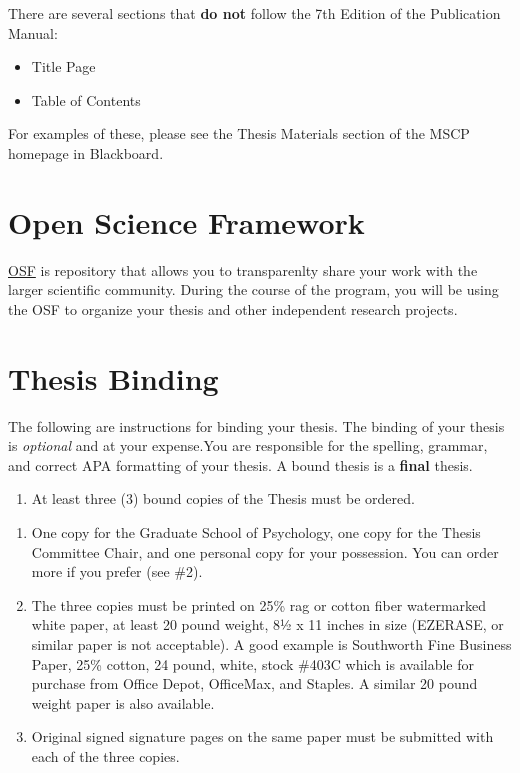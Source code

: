 \documentclass[]{book}
\providecommand{\tightlist}{%
  \setlength{\itemsep}{0pt}\setlength{\parskip}{0pt}}
\begin{document}
There are several sections that \textbf{do not} follow the 7th Edition of the Publication Manual:

\begin{itemize}
\tightlist
\item
  Title Page
\item
  Table of Contents
\end{itemize}

For examples of these, please see the Thesis Materials section of the MSCP homepage in Blackboard.

\hypertarget{open-science-framework}{%
\chapter{Open Science Framework}\label{open-science-framework}}

\href{https://osf.io/}{OSF} is repository that allows you to transparenlty share your work with the larger scientific community. During the course of the program, you will be using the OSF to organize your thesis and other independent research projects.

\hypertarget{thesis-binding}{%
\chapter{Thesis Binding}\label{thesis-binding}}

The following are instructions for binding your thesis. The binding of your thesis is \emph{optional} and at your expense.You are responsible for the spelling, grammar, and correct APA formatting of your thesis. A bound thesis is a \textbf{final} thesis.

\begin{enumerate}
\def\labelenumi{\arabic{enumi}.}
\tightlist
\item
  At least three (3) bound copies of the Thesis must be ordered.
\end{enumerate}

\begin{enumerate}
\def\labelenumi{\alph{enumi}.}
\tightlist
\item
  One copy for the Graduate School of Psychology, one copy for the Thesis Committee Chair, and one personal copy for your possession. You can order more if you prefer (see \#2).
\item
  The three copies must be printed on 25\% rag or cotton fiber watermarked white paper, at least 20 pound weight, 8½ x 11 inches in size (EZERASE, or similar paper is not acceptable). A good example is Southworth Fine Business Paper, 25\% cotton, 24 pound, white, stock \#403C which is available for purchase from Office Depot, OfficeMax, and Staples. A similar 20 pound weight paper is also available.
\item
  Original signed signature pages on the same paper must be submitted with each of the three copies.
\end{enumerate}
\end{document}
